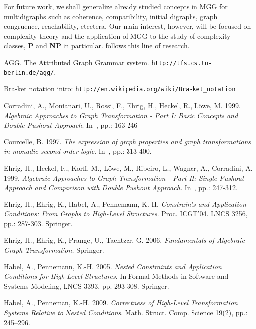 \documentclass{fundam}
\begin{document}
For future work, we shall generalize already studied concepts in MGG
for multidigraphs such as coherence, compatibility, initial digraphs,
graph congruence, reachability, etcetera. Our main interest, however,
will be focused on complexity theory and the application of MGG to the
study of complexity classes, \textbf{P} and \textbf{NP} in
particular. \cite{MGGmodel} follows this line of research.



\begin{thebibliography}{10}\label{bibliography}

 AGG, The Attributed Graph Grammar system. {\texttt
    {http://tfs.cs.tu-berlin.de/agg/}}.

 Bra-ket notation intro:
  {\texttt{http://en.wikipedia.org/wiki/Bra-ket\_notation}}

 Corradini, A., Montanari, U., Rossi, F., Ehrig,
  H., Heckel, R., L\"owe, M. 1999.  {\em Algebraic Approaches to Graph
    Transformation - Part I: Basic Concepts and Double Pushout
    Approach}.  In~\cite{handbook}, pp.: 163-246

 Courcelle, B. 1997. \emph{The expression of graph
    properties and graph transformations in monadic second-order
    logic}.  In~\cite{handbook}, pp.: 313-400.



 Ehrig, H., Heckel, R., Korff, M., L\"owe, M.,
  Ribeiro, L., Wagner, A., Corradini, A. 1999.  {\em Algebraic
    Approaches to Graph Transformation - Part II: Single Pushout
    Approach and Comparison with Double Pushout Approach.}
  In~\cite{handbook}, pp.: 247-312.

 Ehrig, H., Ehrig, K., Habel, A., Pennemann, K.-H.
  {\em Constraints and Application Conditions: From Graphs to
    High-Level Structures}.  Proc. ICGT'04. LNCS 3256, pp.: 287-303.
  Springer.

 Ehrig, H., Ehrig, K., Prange, U., Taentzer, G.
  2006.  {\em Fundamentals of Algebraic Graph Transformation.}
  Springer.



 Habel, A., Pennemann, K.-H. 2005. {\em Nested
    Constraints and Application Conditions for High-Level Structures}.
  In Formal Methods in Software and Systems Modeling, LNCS 3393, pp.
  293-308. Springer.

 Habel, A., Penneman, K.-H. 2009. {\em Correctness of High-Level
Transformation Systems Relative to Nested
Conditions}. Math. Struct. Comp. Science 19(2), pp.: 245--296.


\end{thebibliography}
\end{document}
